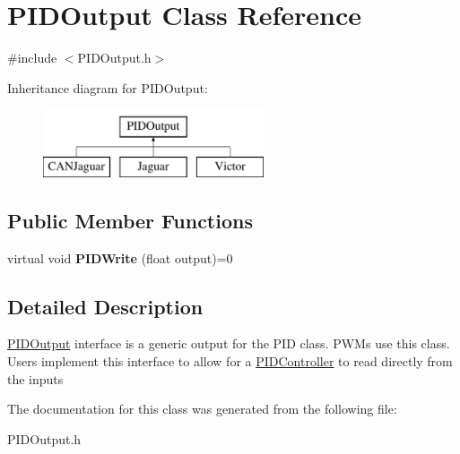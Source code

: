 \hypertarget{classPIDOutput}{\section{\-P\-I\-D\-Output \-Class \-Reference}
\label{classPIDOutput}
}


{\ttfamily \#include $<$\-P\-I\-D\-Output.\-h$>$}

\-Inheritance diagram for \-P\-I\-D\-Output\-:\begin{figure}[H]
\begin{center}
\leavevmode
\includegraphics[height=2.000000cm]{classPIDOutput}
\end{center}
\end{figure}
\subsection*{\-Public \-Member \-Functions}
\begin{DoxyCompactItemize}
\item 
\hypertarget{classPIDOutput_abec3beb51de7fc129520b99ca133a1a7}{virtual void {\bfseries \-P\-I\-D\-Write} (float output)=0}\label{classPIDOutput_abec3beb51de7fc129520b99ca133a1a7}

\end{DoxyCompactItemize}


\subsection{\-Detailed \-Description}
\hyperlink{classPIDOutput}{\-P\-I\-D\-Output} interface is a generic output for the \-P\-I\-D class. \-P\-W\-Ms use this class. \-Users implement this interface to allow for a \hyperlink{classPIDController}{\-P\-I\-D\-Controller} to read directly from the inputs 

\-The documentation for this class was generated from the following file\-:\begin{DoxyCompactItemize}
\item 
\-P\-I\-D\-Output.\-h\end{DoxyCompactItemize}
